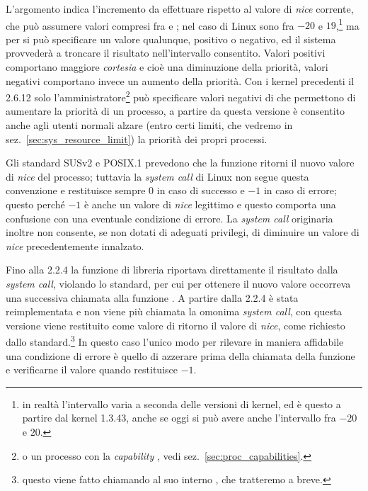 
L'argomento  indica l'incremento da effettuare rispetto al valore
di \textit{nice} corrente, che può assumere valori compresi fra
 e ; nel caso di Linux sono fra $-20$ e
$19$,\footnote{in realtà l'intervallo varia a seconda delle versioni di
  kernel, ed è questo a partire dal kernel 1.3.43, anche se oggi si può avere
  anche l'intervallo fra $-20$ e $20$.} ma per  si può specificare
un valore qualunque, positivo o negativo, ed il sistema provvederà a troncare
il risultato nell'intervallo consentito. Valori positivi comportano maggiore
\textit{cortesia} e cioè una diminuzione della priorità, valori negativi
comportano invece un aumento della priorità. Con i kernel precedenti il 2.6.12
solo l'amministratore\footnote{o un processo con la \textit{capability}
  , vedi sez.~\ref{sec:proc_capabilities}.} può
specificare valori negativi di  che permettono di aumentare la
priorità di un processo, a partire da questa versione è consentito anche agli
utenti normali alzare (entro certi limiti, che vedremo in
sez.~\ref{sec:sys_resource_limit}) la priorità dei propri processi.


Gli standard SUSv2 e POSIX.1 prevedono che la funzione ritorni il nuovo valore
di \textit{nice} del processo; tuttavia la \textit{system call} di Linux non
segue questa convenzione e restituisce sempre $0$ in caso di successo e $-1$
in caso di errore; questo perché $-1$ è anche un valore di \textit{nice}
legittimo e questo comporta una confusione con una eventuale condizione di
errore. La \textit{system call} originaria inoltre non consente, se non dotati
di adeguati privilegi, di diminuire un valore di \textit{nice} precedentemente
innalzato.
 
Fino alla  2.2.4 la funzione di libreria riportava direttamente il
risultato dalla \textit{system call}, violando lo standard, per cui per
ottenere il nuovo valore occorreva una successiva chiamata alla funzione
. A partire dalla  2.2.4  è stata
reimplementata e non viene più chiamata la omonima \textit{system call}, con
questa versione viene restituito come valore di ritorno il valore di
\textit{nice}, come richiesto dallo standard.\footnote{questo viene fatto
  chiamando al suo interno , che tratteremo a breve.}  In
questo caso l'unico modo per rilevare in maniera affidabile una condizione di
errore è quello di azzerare  prima della chiamata della funzione e
verificarne il valore quando  restituisce $-1$.


